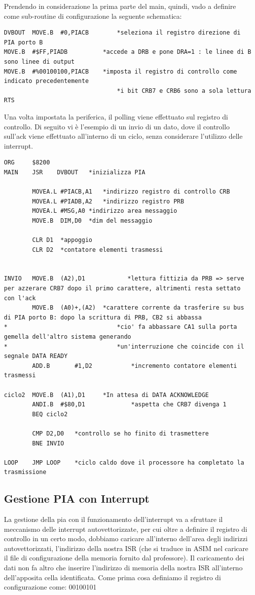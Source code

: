 Prendendo in considerazione la prima parte del main, quindi, vado a definire come sub-routine di configurazione la seguente schematica:
\begin{lstlisting}
DVBOUT	MOVE.B	#0,PIACB		*seleziona il registro direzione di PIA porto B 
MOVE.B	#$FF,PIADB	  		*accede a DRB e pone DRA=1 : le linee di B sono linee di output	
MOVE.B	#%00100100,PIACB   	*imposta il registro di controllo come indicato precedentemente
								*i bit CRB7 e CRB6 sono a sola lettura	
RTS
\end{lstlisting}

Una volta impostata la periferica, il polling viene effettuato sul registro di controllo. Di seguito vi è l'esempio di un invio di un dato, dove il controllo sull'ack viene effettuato all'interno di un ciclo, senza considerare l'utilizzo delle interrupt.

\begin{lstlisting}
ORG     $8200
MAIN    JSR    DVBOUT	*inizializza PIA 

        MOVEA.L	#PIACB,A1	*indirizzo registro di controllo CRB
        MOVEA.L	#PIADB,A2	*indirizzo registro PRB
        MOVEA.L	#MSG,A0	*indirizzo area messaggio
        MOVE.B	DIM,D0	*dim del messaggio

        CLR	D1	*appoggio
        CLR	D2	*contatore elementi trasmessi


INVIO	MOVE.B	(A2),D1            *lettura fittizia da PRB => serve per azzerare CRB7 dopo il primo carattere, altrimenti resta settato con l'ack
        MOVE.B	(A0)+,(A2)	*carattere corrente da trasferire su bus di PIA porto B: dopo la scrittura di PRB, CB2 si abbassa
*								*cio' fa abbassare CA1 sulla porta gemella dell'altro sistema generando 
*								*un'interruzione che coincide con il segnale DATA READY
        ADD.B		#1,D2		    *incremento contatore elementi trasmessi

ciclo2	MOVE.B	(A1),D1		*In attesa di DATA ACKNOWLEDGE
        ANDI.B	#$80,D1				*aspetta che CRB7 divenga 1
        BEQ	ciclo2

        CMP	D2,D0	*controllo se ho finito di trasmettere
        BNE	INVIO

LOOP  	JMP LOOP	*ciclo caldo dove il processore ha completato la trasmissione	
\end{lstlisting}

\newpage

\subsection{Gestione PIA con Interrupt}\label{par:PIA-POL}
La gestione della pia con il funzionamento dell'interrupt va a sfruttare il meccanismo delle interrupt autovettorizzate, per cui oltre a definire il registro di controllo in un certo modo, dobbiamo caricare all'interno dell'area degli indirizzi autovettorizzati, l'indirizzo della nostra ISR (che si traduce in ASIM nel caricare il file di configurazione della memoria fornito dal professore). Il caricamento dei dati non fa altro che inserire l'indirizzo di memoria della nostra ISR all'interno dell'apposita cella identificata.
Come prima cosa definiamo il registro di configurazione come: 00100101

